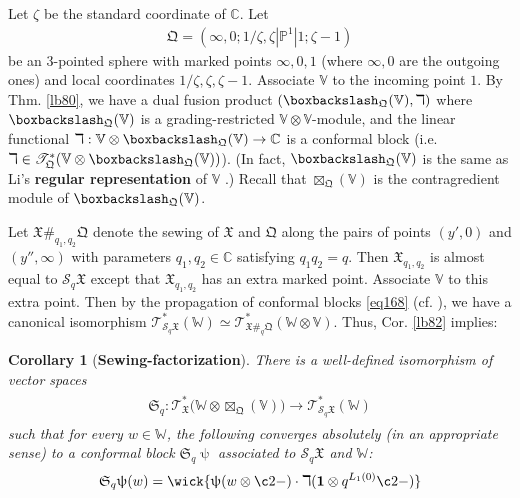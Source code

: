 \documentclass[11pt,b5paper,notitlepage]{article}
\theoremstyle{definition}
\theoremstyle{plain}
\newtheorem{co}[df]{Corollary}
\newcommand{\fk}{\mathfrak}
\newcommand{\mc}{\mathcal}
\newcommand{\id}{\mathbf{1}}
\newcommand{\scr}{\mathscr}
\newcommand{\Vbb}{\mathbb V}
\newcommand{\Wbb}{\mathbb W}
\newcommand{\Cbb}{\mathbb C}
\newcommand{\Pbb}{\mathbb P}
\newcommand{\<}{\left\langle}
\renewcommand{\>}{\right\rangle}
\newcommand{\fx}{\mathfrak{X}}
\newcommand{\bbs}{\boxbackslash}
\newcommand{\fq}{{\mathfrak Q}}
\numberwithin{equation}{subsection}
\begin{document}
Let $\zeta$ be the standard coordinate of $\Cbb$. Let
\begin{align}
\fq=(\infty,0;1/\zeta,\zeta|\Pbb^1|1;\zeta-1)   \label{eq171}
\end{align}
be an $3$-pointed sphere with marked points $\infty,0,1$ (where $\infty,0$ are the outgoing ones) and local coordinates $1/\zeta,\zeta,\zeta-1$. Associate $\Vbb$ to the incoming point $1$. By Thm. \ref{lb80}, we have a dual fusion product $(\bbs_\fq(\Vbb),\daleth)$ where $\bbs_\fq(\Vbb)$ is a grading-restricted $\Vbb\otimes\Vbb$-module, and the linear functional $\daleth:\Vbb\otimes \bbs_\fq(\Vbb)\rightarrow\Cbb$ is a conformal block (i.e. $\daleth\in\scr T_\fq^*(\Vbb\otimes\bbs_\fq(\Vbb))$). (In fact, $\bbs_\fq(\Vbb)$ is the same as Li's \textbf{regular representation} of $\Vbb$ \cite{Li-regular-rep,LS-twisted-regular-rep}.) Recall that $\boxtimes_\fq(\Vbb)$ is the contragredient module of $\bbs_\fq(\Vbb)$. 

Let $\fx\#_{q_1,q_2}\fq$ denote the sewing of $\fx$ and $\fq$ along the pairs of points $(y',0)$ and $(y'',\infty)$ with parameters $q_1,q_2\in\Cbb$ satisfying $q_1q_2=q$. Then $\fx_{q_1,q_2}$ is almost equal to $\mc S_q\fx$ except that $\fx_{q_1,q_2}$ has an extra marked point. Associate $\Vbb$ to this extra point. Then by the propagation of conformal blocks \eqref{eq168} (cf. \cite{Zhu-global,FB04,Cod19,DGT1,Gui-propagation}), we have a canonical isomorphism $\scr T_{\mc S_q\fx}^*(\Wbb)\simeq\scr T_{\fx\#_q\fq}^*(\Wbb\otimes\Vbb)$. Thus, Cor. \ref{lb82} implies:

\begin{co}[\textbf{Sewing-factorization}]\label{lb85}
There is a well-defined isomorphism of vector spaces
\begin{gather}
\begin{gathered}
\fk S_q:\scr T_\fx^*\big(\Wbb\otimes\boxtimes_\fq(\Vbb)\big)\rightarrow\scr T_{\mc S_q\fx}^*(\Wbb)
\end{gathered}
\end{gather}
such that for every $w\in\Wbb$, the following converges absolutely (in an appropriate sense) to a conformal block $\fk S_q\uppsi$ associated to $\mc S_q\fx$ and $\Wbb$:
\begin{align}
\fk S_q\uppsi(w)=\wick{\uppsi(w\otimes \c2 -)\cdot \daleth(\id\otimes q^{L_1(0)} \c2-)}\label{eq169}
\end{align}
\end{co}
\end{document}
